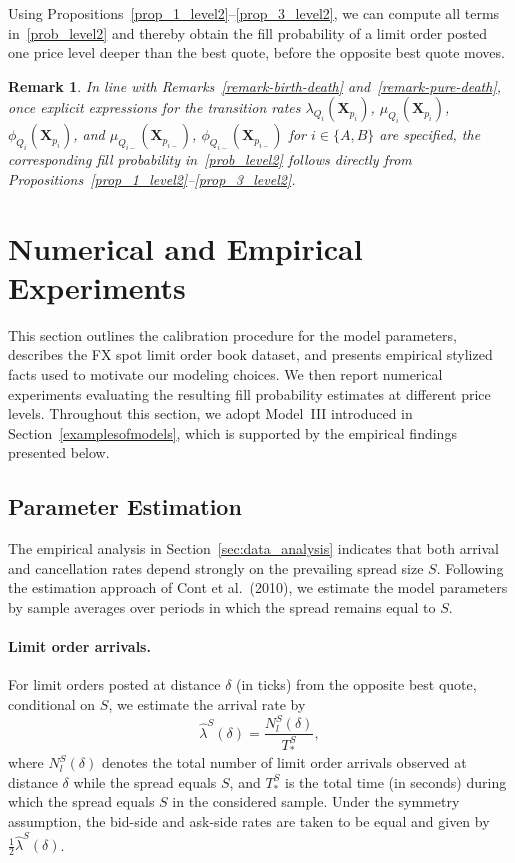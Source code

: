 \documentclass[11pt]{article}
\newtheorem{remark}{Remark}
\begin{document}
Using Propositions~\ref{prop_1_level2}--\ref{prop_3_level2}, we can compute all terms in~\eqref{prob_level2} and thereby obtain the fill probability of a limit order posted one price level deeper than the best quote, before the opposite best quote moves.

\begin{remark}
In line with Remarks~\ref{remark-birth-death} and~\ref{remark-pure-death}, once explicit expressions for the transition rates
$\lambda_{Q_i}(\boldsymbol{X}_{p_i})$, $\mu_{Q_i}(\boldsymbol{X}_{p_i})$, $\phi_{Q_i}(\boldsymbol{X}_{p_i})$,
and $\mu_{Q_{i-}}(\boldsymbol{X}_{p_{i-}})$, $\phi_{Q_{i-}}(\boldsymbol{X}_{p_{i-}})$ for $i\in\{A,B\}$ are specified, the corresponding fill probability in~\eqref{prob_level2} follows directly from Propositions~\ref{prop_1_level2}--\ref{prop_3_level2}.
\end{remark}

\section{Numerical and Empirical Experiments}\label{sec: inv_LT_comparison}

This section outlines the calibration procedure for the model parameters, describes the FX spot limit order book dataset, and presents empirical stylized facts used to motivate our modeling choices. We then report numerical experiments evaluating the resulting fill probability estimates at different price levels. Throughout this section, we adopt Model~III introduced in Section~\ref{examplesofmodels}, which is supported by the empirical findings presented below.


\subsection{Parameter Estimation}\label{sec: param_est}

The empirical analysis in Section~\ref{sec:data_analysis} indicates that both arrival and cancellation rates depend strongly on the prevailing spread size $S$. 
Following the estimation approach of Cont et al.\ (2010), we estimate the model parameters by sample averages over periods in which the spread remains equal to $S$.

\paragraph{Limit order arrivals.}
For limit orders posted at distance $\delta$ (in ticks) from the opposite best quote, conditional on $S$, we estimate the arrival rate by 
\begin{equation}\label{lambda_est}
    \hat{\lambda}^S(\delta)
    =
    \frac{N_l^S(\delta)}{T_*^S},
\end{equation}
where $N_l^S(\delta)$ denotes the total number of limit order arrivals observed at distance $\delta$ while the spread equals $S$, and $T_*^S$ is the total time (in seconds) during which the spread equals $S$ in the considered sample.
Under the symmetry assumption, the bid-side and ask-side rates are taken to be equal and given by $\tfrac{1}{2}\hat{\lambda}^S(\delta)$.
\end{document}
